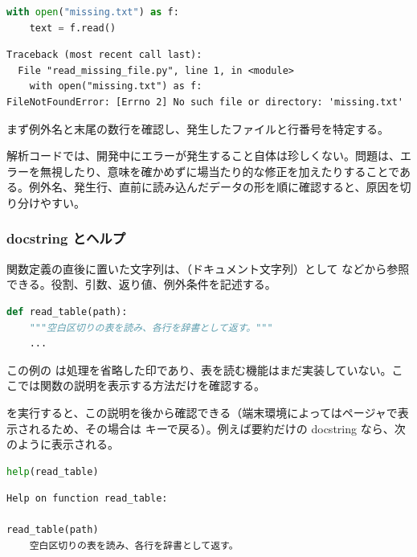\begin{lstlisting}[language=Python]
with open("missing.txt") as f:
    text = f.read()
\end{lstlisting}

\begin{lstlisting}[numbers=none, xleftmargin=2\zw]
Traceback (most recent call last):
  File "read_missing_file.py", line 1, in <module>
    with open("missing.txt") as f:
FileNotFoundError: [Errno 2] No such file or directory: 'missing.txt'
\end{lstlisting}

まず例外名と末尾の数行を確認し、発生したファイルと行番号を特定する。

解析コードでは、開発中にエラーが発生すること自体は珍しくない。問題は、エラーを無視したり、意味を確かめずに場当たり的な修正を加えたりすることである。例外名、発生行、直前に読み込んだデータの形を順に確認すると、原因を切り分けやすい。

\subsubsection{docstring とヘルプ}

関数定義の直後に置いた文字列は、（ドキュメント文字列）として  などから参照できる。役割、引数、返り値、例外条件を記述する。

\begin{lstlisting}[language=Python]
def read_table(path):
    """空白区切りの表を読み、各行を辞書として返す。"""
    ...
\end{lstlisting}

この例の  は処理を省略した印であり、表を読む機能はまだ実装していない。ここでは関数の説明を表示する方法だけを確認する。

 を実行すると、この説明を後から確認できる（端末環境によってはページャで表示されるため、その場合は  キーで戻る）。例えば要約だけの docstring なら、次のように表示される。

\begin{lstlisting}[language=Python]
help(read_table)
\end{lstlisting}

\begin{lstlisting}[numbers=none, xleftmargin=2\zw]
Help on function read_table:

read_table(path)
    空白区切りの表を読み、各行を辞書として返す。
\end{lstlisting}

